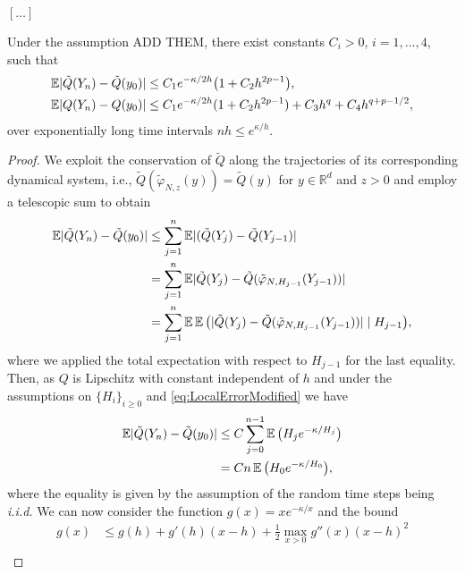 \documentclass{siamart1116}
\numberwithin{theorem}{section}
\DeclarePairedDelimiter{\abs}{\lvert}{\rvert}
\renewcommand{\phi}{\varphi}
\newcommand{\R}{\mathbb{R}}
\newcommand{\E}{\operatorname{\mathbb{E}}}
\begin{document}
$[\ldots]$

\begin{lemma}\label{lem:RTSHamiltonian} Under the assumption {\color{red} ADD THEM}, there exist constants $C_i > 0$, $i = 1, \ldots, 4$, such that
	\begin{align}
		\E \abs{\tilde Q(Y_n) - \tilde Q(y_0)} &\leq C_1 e^{-\kappa/2h}\big(1 + C_2 h^{2p-1}\big), \\
		\E \abs{Q(Y_n) - Q(y_0)} &\leq C_1 e^{-\kappa/2h}(1 + C_2 h^{2p-1}) + C_3 h^q + C_4h^{q+p-1/2},
	\end{align}
	over exponentially long time intervals $nh \leq e^{\kappa / h}$.
\end{lemma}
\begin{proof} We exploit the conservation of $\tilde Q$ along the trajectories of its corresponding dynamical system, i.e., $\tilde Q (\tilde \phi_{N,z} (y)) = \tilde Q(y)$ for $y \in \R^d$ and $z > 0$ and employ a telescopic sum to obtain
\begin{equation}
\begin{aligned}
	\E \abs{\tilde Q(Y_n) - \tilde Q(y_0)} &\leq \sum_{j=1}^{n} \E\abs{(\tilde Q(Y_{j}) - \tilde Q(Y_{j-1})} \\
	&= \sum_{j=1}^{n} \E \abs{\tilde Q(Y_j) - \tilde Q(\tilde\phi_{N, H_{j-1}}(Y_{j-1}))} \\
	&= \sum_{j=1}^{n} \E\E\big(\abs{\tilde Q(Y_j) - \tilde Q (\tilde\phi_{N, H_{j-1}}(Y_{j-1}))} \mid H_{j-1}\big),
\end{aligned}
\end{equation}
where we applied the total expectation with respect to $H_{j-1}$ for the last equality. Then, as $Q$ is Lipschitz with constant independent of $h$ and under the assumptions on $\{H_i\}_{i\geq 0}$ and \eqref{eq:LocalErrorModified} we have
\begin{equation}
\begin{aligned}
\E \abs{\tilde Q(Y_n) - \tilde Q(y_0)} &\leq C \sum_{j=0}^{n-1} \E\big(H_{j}e^{-\kappa/H_j}\big)\\
&= C n \E\big(H_0e^{-\kappa/H_0}\big),
\end{aligned}
\end{equation}
where the equality is given by the assumption of the random time steps being \textit{i.i.d.} We can now consider the function $g(x) = xe^{-\kappa/x}$ and the bound
\begin{equation}
\begin{aligned}
	g(x) &\leq g(h) + g'(h) (x - h) + \frac{1}{2} \max_{x>0} g''(x) (x - h)^2 \\

\end{aligned}
\end{equation}
\end{proof}
\end{document}
